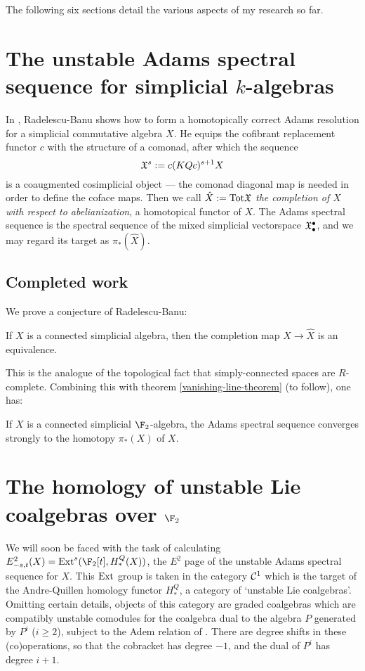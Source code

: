 \documentclass[11pt]{article}
\begin{document}
\textup{}

\noindent The following six sections detail the various aspects of my research so far.



\section{The unstable Adams spectral sequence for simplicial $k$-algebras}
In \cite{radelescuBanu.pdf}, Radelescu-Banu shows how to form a homotopically correct Adams resolution for a simplicial commutative algebra $X$. He equips the cofibrant replacement functor $c$ with the structure of a comonad, after which the sequence
\[\mathfrak{X}^s:=c(KQc)^{s+1}X\]
is a coaugmented cosimplicial object --- the comonad diagonal map is needed in order to define the coface maps. Then we call $\hat X:=\textup{Tot}\mathfrak{X}$ \emph{the completion of $X$ with respect to abelianization}, a homotopical functor of $X$. The Adams spectral sequence is the spectral sequence of the mixed simplicial vectorspace $\mathfrak{X}^\bullet_\bullet$, and we may regard its target as $\pi_*(\hat X)$.

\subsection{Completed work}
We prove a conjecture of Radelescu-Banu:
\begin{thm}
If $X$ is a connected simplicial algebra, then the completion map $X\to \hat X$ is an equivalence.
\end{thm}
This is the analogue of the topological fact that simply-connected spaces are $R$-complete. Combining this with theorem \ref{vanishing-line-theorem} (to follow), one has:
\begin{cor}
If $X$ is a connected simplicial $\F_2$-algebra, the Adams spectral sequence converges strongly to the homotopy $\pi_*(X)$ of $X$.
\end{cor}
\section{The homology of unstable Lie coalgebras over $\F_2$}
We will soon be faced with the task of calculating $E^2_{-s,t}(X)=\Ext^s(\F_2[t],H_*^Q(X))$, the $E^2$ page of the unstable Adams spectral sequence for $X$. This $\operatorname{Ext}$ group is taken in the category $\mathcal{C}^1$ which is the target of the Andre-Quillen homology functor $H_*^Q$, a category of `unstable Lie coalgebras'. Omitting certain details, objects of this category are graded coalgebras which are compatibly unstable comodules for the coalgebra dual to the algebra $P$ generated by $P^i$ ($i\geq2$), subject to the Adem relation of \cite[p.17]{MR1089001}. There are degree shifts in these (co)operations, so that the cobracket has degree $-1$, and the dual of $P^i$ has degree $i+1$.
\end{document}
